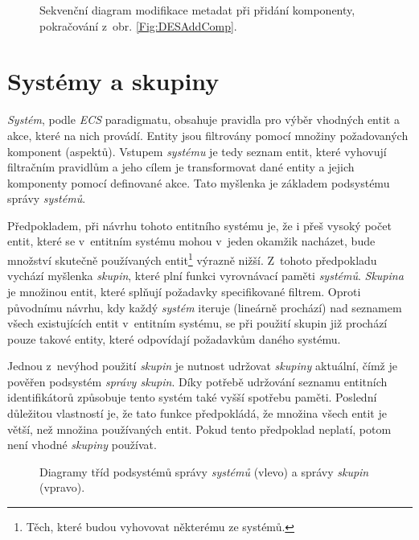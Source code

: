 \begin{figure}[H]
	\centering
	\caption{Sekvenční diagram modifikace metadat při přidání komponenty, pokračování z~obr. \ref{Fig:DESAddComp}.}
	\label{Fig:DESAddEnt}
\end{figure}

\section{Systémy a skupiny}
\label{Chap:SysGroup}

\emph{Systém}, podle \emph{ECS} paradigmatu, obsahuje pravidla pro výběr vhodných entit a akce, které na nich provádí. Entity jsou filtrovány pomocí množiny požadovaných komponent (aspektů). Vstupem \emph{systému} je tedy seznam entit, které vyhovují filtračním pravidlům a jeho cílem je transformovat dané entity a jejich komponenty pomocí definované akce. Tato myšlenka je základem podsystému správy \emph{systémů}. 

Předpokladem, při návrhu tohoto entitního systému je, že i přeš vysoký počet entit, které se v~entitním systému mohou v~jeden okamžik nacházet, bude množství skutečně používaných entit\footnote{Těch, které budou vyhovovat některému ze systémů.} výrazně nižší. Z~tohoto předpokladu vychází myšlenka \emph{skupin}, které plní funkci vyrovnávací paměti \emph{systémů}. \emph{Skupina} je množinou entit, které splňují požadavky specifikované filtrem. Oproti původnímu návrhu, kdy každý \emph{systém} iteruje (lineárně prochází) nad seznamem všech existujících entit v~entitním systému, se při použití skupin již prochází pouze takové entity, které odpovídají požadavkům daného systému.

Jednou z~nevýhod použití \emph{skupin} je nutnost udržovat \emph{skupiny} aktuální, čímž je pověřen podsystém \emph{správy skupin}. Díky potřebě udržování seznamu entitních identifikátorů způsobuje tento systém také vyšší spotřebu paměti. Poslední důležitou vlastností je, že tato funkce předpokládá, že množina všech entit je větší, než množina používaných entit. Pokud tento předpoklad neplatí, potom není vhodné \emph{skupiny} používat.

\begin{figure}[H]
	\centering
	\caption{Diagramy tříd podsystémů správy \emph{systémů} (vlevo) a správy \emph{skupin} (vpravo).}
	\label{Fig:DESSysGrpDiagram}
\end{figure}

